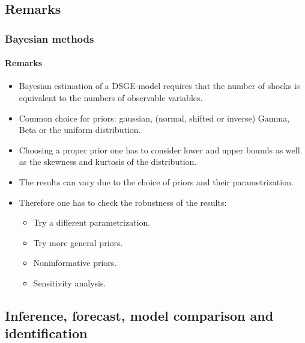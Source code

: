 \documentclass[handout]{beamer}  %
\begin{document}
\subsection{Remarks}
\begin{frame}\frametitle{Bayesian methods}\framesubtitle{Remarks}
	\begin{itemize}
		\item Bayesian estimation of a DSGE-model requires that the number of shocks is equivalent to the numbers of observable variables.
		\item Common choice for priors: gaussian, (normal, shifted or inverse) Gamma, Beta or the uniform distribution.
		\item Choosing a proper prior one has to consider lower and upper bounds as well as the skewness and kurtosis of the distribution.
		\item The results can vary due to the choice of priors and their parametrization.
		\item Therefore one has to check the robustness of the results:
		\begin{itemize}
			\item Try a different parametrization.
			\item Try more general priors.
			\item Noninformative priors.
			\item Sensitivity analysis.
		\end{itemize}
	\end{itemize}
\end{frame}


\subsection{Inference, forecast, model comparison and identification}
\end{document}
